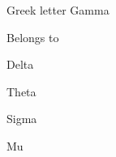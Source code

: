 \begin{simbolos}
  \item[$ \gamma $] Greek letter Gamma
  \item[$ \in $] Belongs to
  \item[$ \delta$] Delta
  \item[$ \theta$] Theta
  \item[$ \sigma$] Sigma
  \item[$ \mu$] Mu
\end{simbolos}
